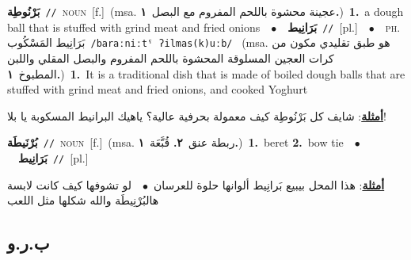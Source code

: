 \documentclass[10pt,a4paper,twoside]{article} %
\begin{document}
\begin{multicols}{2}
{\setlength\topsep{0pt}\textbf{\foreignlanguage{arabic}{بَرْنُوطِة}}\ {\color{gray}\texttt{//}\color{black}}\ \textsc{noun}\ [f.]\ \color{gray}(msa. \foreignlanguage{arabic}{عجينة محشوة باللحم المفروم مع البصل}~\foreignlanguage{arabic}{\textbf{١.}})\color{black}\ \textbf{1.}~a dough ball that is stuffed with grind meat and fried onions\ \ $\bullet$\ \ \setlength\topsep{0pt}\textbf{\foreignlanguage{arabic}{بَرَانِيط}}\ {\color{gray}\texttt{//}\color{black}}\ [pl.]\ \ $\bullet$\ \ \textsc{ph.} \color{gray} \foreignlanguage{arabic}{بَرَانِيط المَسْكُوب}\color{black}\ {\color{gray}\texttt{/{\sffamily baraːniːtˤ ʔilmas(k)uːb}/}\color{black}}\ \color{gray} (msa. \foreignlanguage{arabic}{هو طبق تقليدي مكون من كرات العجين المسلوقة المحشوة باللحم المفروم والبصل المقلي واللبن المطبوخ}~\foreignlanguage{arabic}{\textbf{١.}})\color{black}\ \textbf{1.}~It is a traditional dish that is made of boiled dough balls that are stuffed with grind meat and fried onions, and cooked Yoghurt\  \begin{flushright}\color{gray}\foreignlanguage{arabic}{\textbf{\underline{\foreignlanguage{arabic}{أمثلة}}}: شايف كل بَرْنُوطِة كيف معمولة بحرفية عالية؟ ياهيك البرانيط المسكوبة يا بلا!}\end{flushright}\color{black}} \vspace{2mm}

{\setlength\topsep{0pt}\textbf{\foreignlanguage{arabic}{بُرْنَيطَة}}\ {\color{gray}\texttt{//}\color{black}}\ \textsc{noun}\ [f.]\ \color{gray}(msa. \foreignlanguage{arabic}{ربطة عنق}~\foreignlanguage{arabic}{\textbf{٢.}}  \foreignlanguage{arabic}{قُبَّعَة}~\foreignlanguage{arabic}{\textbf{١.}})\color{black}\ \textbf{1.}~beret  \textbf{2.}~bow tie\ \ $\bullet$\ \ \setlength\topsep{0pt}\textbf{\foreignlanguage{arabic}{بَرَانِيط}}\ {\color{gray}\texttt{//}\color{black}}\ [pl.]\  \begin{flushright}\color{gray}\foreignlanguage{arabic}{\textbf{\underline{\foreignlanguage{arabic}{أمثلة}}}: هذا المحل بيبيع بَرانِيط ألوانها حلوة للعرسان\ $\bullet$\ \  لو تشوفها كيف كانت لابسة هالبُرْنِيطَة والله شكلها مثل اللعب}\end{flushright}\color{black}} \vspace{2mm}

\vspace{-3mm}
\subsection*{\color{blue}\foreignlanguage{arabic}{ب.ر.و}\color{blue}{}} 


\end{multicols}
\end{document}
